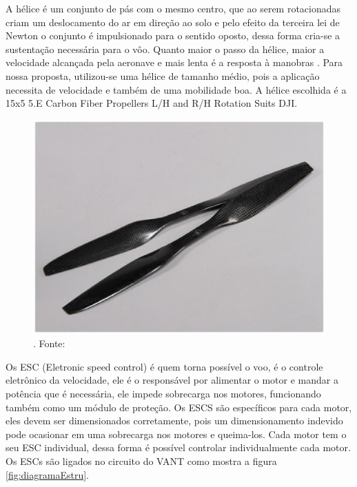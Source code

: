 A hélice é um conjunto de pás com o mesmo centro, que ao serem rotacionadas criam um deslocamento do ar em direção ao solo e pelo efeito da terceira lei de Newton o conjunto é impulsionado para o sentido oposto, dessa forma cria-se a sustentação necessária para o vôo.  Quanto maior o passo da hélice, maior a velocidade alcançada  pela aeronave e mais lenta é a resposta à manobras \cite{VIOLATO}. Para nossa proposta, utilizou-se uma hélice de tamanho médio, pois a aplicação necessita de velocidade e também de uma mobilidade boa. A hélice escolhida é a 15x5 5.E Carbon  Fiber  Propellers  L/H  and  R/H  Rotation  Suits DJI.

\begin{figure}[H]
    \centering
      \includegraphics[keepaspectratio=true,scale=0.5]{figuras/diagramaEstru.eps}
    \caption{\cite{VIOLATO}. Fonte: \cite{pinto}}
    \label{fig:elice}
\end{figure}

Os ESC (Eletronic speed control) é quem torna possível o voo, é o controle eletrônico da velocidade, ele é o responsável por alimentar o motor e mandar a potência que é necessária, ele impede sobrecarga nos motores, funcionando também como um módulo de proteção. Os ESCS são específicos para cada motor, eles devem ser dimensionados corretamente, pois um dimensionamento indevido pode ocasionar em uma sobrecarga nos motores e queima-los.  Cada motor tem o seu ESC individual, dessa forma é possível controlar individualmente cada motor. Os ESCs são ligados no circuito do VANT como mostra a figura \ref{fig:diagramaEstru}.
 

